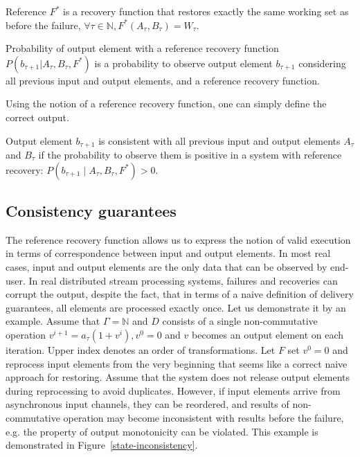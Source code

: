 \begin{definition}{Reference}
$F^{*}$ is a recovery function that restores exactly the same working set as before the failure, $\forall \tau \in \mathbb{N}, F^{*}(A_\tau,B_\tau)=W_\tau$.
\end{definition}

\begin{definition}{Probability of output element with a reference recovery function}
$P(b_{\tau+1}|A_{\tau}, B_\tau, F^{*})$ is a probability to observe output element $b_{\tau+1}$ considering all previous input and output elements, and a reference recovery function.
\end{definition}

Using the notion of a reference recovery function, one can simply define the correct output. 

\begin{definition}{Output element $b_{\tau+1}$ is consistent}
with all previous input and output elements $A_\tau$ and $B_\tau$ if the probability to observe them is positive in a system with reference recovery: $P(b_{\tau+1} \mid A_\tau,B_\tau,F^{*})>0$.
\end{definition}

\subsection{Consistency guarantees}

The reference recovery function allows us to express the notion of valid execution in terms of correspondence between input and output elements. In most real cases, input and output elements are the only data that can be observed by end-user. In real distributed stream processing systems, failures and recoveries can corrupt the output, despite the fact, that in terms of a naive definition of delivery guarantees, all elements are processed exactly once. Let us demonstrate it by an example. Assume that $\Gamma=\mathbb{N}$ and $D$ consists of a single non-commutative operation $v^{i+1}=a_\tau(1+v^{i}),v^{0}=0$ and $v$ becomes an output element on each iteration. Upper index denotes an order of transformations. Let $F$ set $v^{0}=0$ and reprocess input elements from the very beginning that seems like a correct naive approach for restoring. Assume that the system does not release output elements during reprocessing to avoid duplicates. However, if input elements arrive from asynchronous input channels, they can be reordered, and results of non-commutative operation may become inconsistent with results before the failure, e.g. the property of output monotonicity can be violated. This example is demonstrated in Figure~\ref{state-inconsistency}. 

